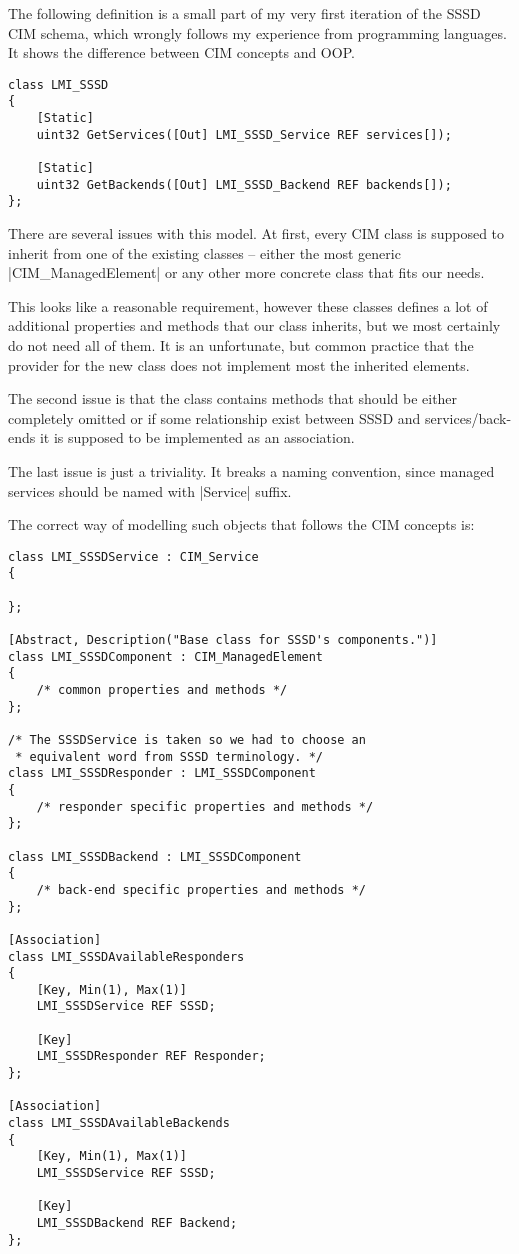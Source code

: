 The following definition is a small part of my very first iteration of the SSSD
CIM schema, which wrongly follows my experience from programming languages.
It shows the difference between CIM concepts and OOP.

\begin{lstlisting}[morekeywords={}]
class LMI_SSSD
{
    [Static]
    uint32 GetServices([Out] LMI_SSSD_Service REF services[]);
    
    [Static]
    uint32 GetBackends([Out] LMI_SSSD_Backend REF backends[]);
};
\end{lstlisting}

\funclistend There are several issues with this model. At first, every CIM class
is supposed to inherit from one of the existing classes -- either the most
generic |CIM_ManagedElement| or any other more concrete class that fits our
needs.

This looks like a reasonable requirement, however these classes defines a lot of
additional properties and methods that our class inherits, but we most certainly
do not need all of them. It is an unfortunate, but common practice that the
provider for the new class does not implement most the inherited elements.

The second issue is that the class contains methods that should be either
completely omitted \footnotemark or if some relationship exist between SSSD and
services/back-ends it is supposed to be implemented as an association.


The last issue is just a triviality. It breaks a naming convention, since
managed services should be named with |Service| suffix.

The correct way of modelling such objects that follows the CIM concepts is:

\begin{lstlisting}
class LMI_SSSDService : CIM_Service
{

};

[Abstract, Description("Base class for SSSD's components.")]
class LMI_SSSDComponent : CIM_ManagedElement
{
    /* common properties and methods */
};

/* The SSSDService is taken so we had to choose an
 * equivalent word from SSSD terminology. */ 
class LMI_SSSDResponder : LMI_SSSDComponent
{
    /* responder specific properties and methods */
};

class LMI_SSSDBackend : LMI_SSSDComponent
{
    /* back-end specific properties and methods */
};

[Association]
class LMI_SSSDAvailableResponders
{
    [Key, Min(1), Max(1)]
    LMI_SSSDService REF SSSD;
    
    [Key]
    LMI_SSSDResponder REF Responder;
};

[Association]
class LMI_SSSDAvailableBackends
{
    [Key, Min(1), Max(1)]
    LMI_SSSDService REF SSSD;
    
    [Key]
    LMI_SSSDBackend REF Backend;
};
\end{lstlisting}

